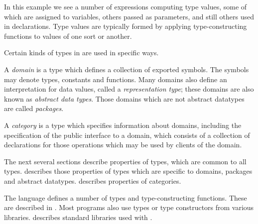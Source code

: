 In this example we see a number of expressions computing type values,
some of which are assigned to variables, others passed as parameters,
and still others used in declarations.
Type values are typically formed by applying type-constructing functions
to values of one sort or another.  

Certain kinds of types in \asharp{} are used in specific ways.

A {\em domain\/} is a type which defines a collection of exported
symbols.  The symbols may denote types, constants and functions.
Many domains also define an interpretation for data values, called
a {\em representation type}; these domains are also known as
{\em abstract data types}.  Those domains which are not abstract datatypes
are called {\em packages}.

A {\em category\/} is a type which specifies information about domains,
including the specification of the public interface to a domain,
which consists of a collection of declarations for those operations
which may be used by clients of the domain.

The next several sections describe properties of types, which are
common to all types.  
describes those properties of types which are specific to domains,
packages and abstract datatypes.
 describes properties of categories.

The language defines a number of types and type-constructing functions.
These are described in .   
Most programs also use types or type constructors from various libraries.
 describes standard libraries used with \asharp{}.


